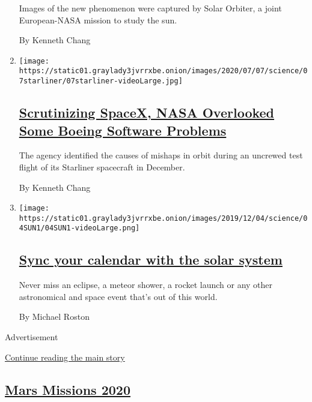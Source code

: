 \begin{enumerate}
  Images of the new phenomenon were captured by Solar Orbiter, a joint
  European-NASA mission to study the sun.

  By Kenneth Chang
\item
  \texttt{[image: https://static01.graylady3jvrrxbe.onion/images/2020/07/07/science/07starliner/07starliner-videoLarge.jpg]}

  \hypertarget{scrutinizing-spacex-nasa-overlooked-some-boeing-software-problems}{%
  \subsection{\texorpdfstring{\href{/2020/07/07/science/boeing-starliner-nasa.html}{Scrutinizing
  SpaceX, NASA Overlooked Some Boeing Software
  Problems}}{Scrutinizing SpaceX, NASA Overlooked Some Boeing Software Problems}}\label{scrutinizing-spacex-nasa-overlooked-some-boeing-software-problems}}

  The agency identified the causes of mishaps in orbit during an
  uncrewed test flight of its Starliner spacecraft in December.

  By Kenneth Chang
\item
  \texttt{[image: https://static01.graylady3jvrrxbe.onion/images/2019/12/04/science/04SUN1/04SUN1-videoLarge.png]}

  \hypertarget{sync-your-calendar-with-the-solar-system}{%
  \subsection{\texorpdfstring{\href{/interactive/2020/science/2020-astronomy-space-calendar.html}{Sync
  your calendar with the solar
  system}}{Sync your calendar with the solar system}}\label{sync-your-calendar-with-the-solar-system}}

  Never miss an eclipse, a meteor shower, a rocket launch or any other
  astronomical and space event that's out of this world.

  By Michael Roston
\end{enumerate}

Advertisement

\protect\hyperlink{after-mid1}{Continue reading the main story}

\hypertarget{mars-missions-2020}{%
\subsection{\texorpdfstring{\href{/news-event/summer-of-mars}{Mars
Missions 2020}}{Mars Missions 2020}}\label{mars-missions-2020}}

